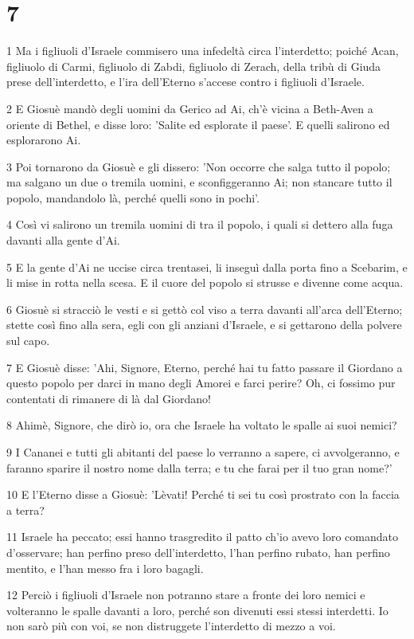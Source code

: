 \chapter{7}

\par 1 Ma i figliuoli d'Israele commisero una infedeltà circa l'interdetto; poiché Acan, figliuolo di Carmi, figliuolo di Zabdi, figliuolo di Zerach, della tribù di Giuda prese dell'interdetto, e l'ira dell'Eterno s'accese contro i figliuoli d'Israele.
\par 2 E Giosuè mandò degli uomini da Gerico ad Ai, ch'è vicina a Beth-Aven a oriente di Bethel, e disse loro: 'Salite ed esplorate il paese'. E quelli salirono ed esplorarono Ai.
\par 3 Poi tornarono da Giosuè e gli dissero: 'Non occorre che salga tutto il popolo; ma salgano un due o tremila uomini, e sconfiggeranno Ai; non stancare tutto il popolo, mandandolo là, perché quelli sono in pochi'.
\par 4 Così vi salirono un tremila uomini di tra il popolo, i quali si dettero alla fuga davanti alla gente d'Ai.
\par 5 E la gente d'Ai ne uccise circa trentasei, li inseguì dalla porta fino a Scebarim, e li mise in rotta nella scesa. E il cuore del popolo si strusse e divenne come acqua.
\par 6 Giosuè si stracciò le vesti e si gettò col viso a terra davanti all'arca dell'Eterno; stette così fino alla sera, egli con gli anziani d'Israele, e si gettarono della polvere sul capo.
\par 7 E Giosuè disse: 'Ahi, Signore, Eterno, perché hai tu fatto passare il Giordano a questo popolo per darci in mano degli Amorei e farci perire? Oh, ci fossimo pur contentati di rimanere di là dal Giordano!
\par 8 Ahimè, Signore, che dirò io, ora che Israele ha voltato le spalle ai suoi nemici?
\par 9 I Cananei e tutti gli abitanti del paese lo verranno a sapere, ci avvolgeranno, e faranno sparire il nostro nome dalla terra; e tu che farai per il tuo gran nome?'
\par 10 E l'Eterno disse a Giosuè: 'Lèvati! Perché ti sei tu così prostrato con la faccia a terra?
\par 11 Israele ha peccato; essi hanno trasgredito il patto ch'io avevo loro comandato d'osservare; han perfino preso dell'interdetto, l'han perfino rubato, han perfino mentito, e l'han messo fra i loro bagagli.
\par 12 Perciò i figliuoli d'Israele non potranno stare a fronte dei loro nemici e volteranno le spalle davanti a loro, perché son divenuti essi stessi interdetti. Io non sarò più con voi, se non distruggete l'interdetto di mezzo a voi.
